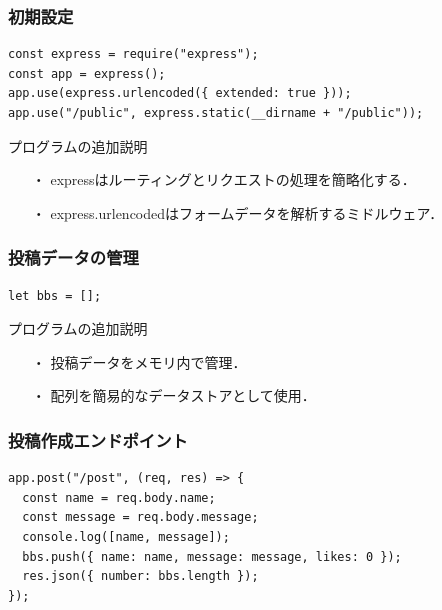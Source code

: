 \documentclass[uplatex,dvipdfmx]{jsarticle}
\begin{document}
\subsubsection{初期設定}

\begin{lstlisting}[label=a]
const express = require("express");
const app = express();
app.use(express.urlencoded({ extended: true }));
app.use("/public", express.static(__dirname + "/public"));
\end{lstlisting}


\begin{itembox}[c]{プログラムの追加説明}
    \begin{enumerate}
        \setlength{\leftskip}{0pt}
        \item[・]expressはルーティングとリクエストの処理を簡略化する．
        \item[・]express.urlencodedはフォームデータを解析するミドルウェア．
    \end{enumerate}
\end{itembox}

\subsubsection{ 投稿データの管理}
\begin{lstlisting}[label=a]
let bbs = [];
\end{lstlisting}

\begin{itembox}[c]{プログラムの追加説明}
    \begin{enumerate}
        \setlength{\leftskip}{0pt}
        \item[・]投稿データをメモリ内で管理．
        \item[・]配列を簡易的なデータストアとして使用．
    \end{enumerate}
\end{itembox}

\subsubsection{投稿作成エンドポイント}
\begin{lstlisting}[label=b]
app.post("/post", (req, res) => {
  const name = req.body.name;
  const message = req.body.message;
  console.log([name, message]);
  bbs.push({ name: name, message: message, likes: 0 });
  res.json({ number: bbs.length });
});
\end{lstlisting}
\end{document}
